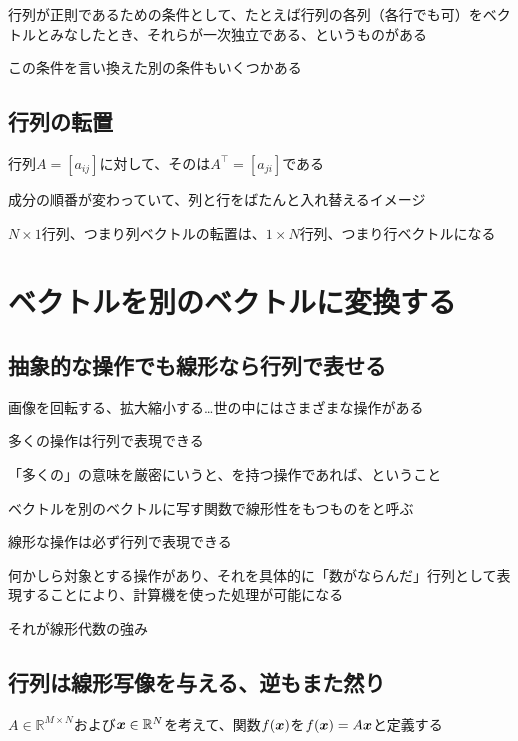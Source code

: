 \documentclass[../book_half_step_linear]{subfiles}
\begin{document}
\br

行列が正則であるための条件として、たとえば行列の各列（各行でも可）をベクトルとみなしたとき、それらが一次独立である、というものがある

この条件を言い換えた別の条件もいくつかある

\sectionline
\subsection{行列の転置}

行列$A=[a_{ij}]$に対して、そのは$A^\top=[a_{ji}]$である

成分の順番が変わっていて、列と行をばたんと入れ替えるイメージ

\br

$N\times 1$行列、つまり列ベクトルの転置は、$1\times N$行列、つまり行ベクトルになる

\section{ベクトルを別のベクトルに変換する}

\subsection{抽象的な操作でも線形なら行列で表せる}

画像を回転する、拡大縮小する…世の中にはさまざまな操作がある

多くの操作は行列で表現できる

「多くの」の意味を厳密にいうと、を持つ操作であれば、ということ

\br

ベクトルを別のベクトルに写す関数で線形性をもつものをと呼ぶ

線形な操作は必ず行列で表現できる

\br

何かしら対象とする操作があり、それを具体的に「数がならんだ」行列として表現することにより、計算機を使った処理が可能になる

それが線形代数の強み

\sectionline
\subsection{行列は線形写像を与える、逆もまた然り}

$A \in \mathbb{R}^{M \times N}$および$\vb*{x} \in \mathbb{R}^N$を考えて、関数$f(\vb*{x})$を$f(\vb*{x}) = A\vb*{x}$と定義する
\end{document}
